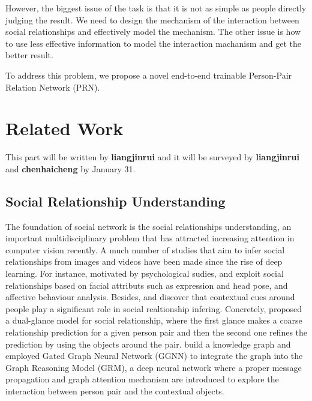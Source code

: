 \documentclass{article}
\begin{document}
However, the biggest issue of the task is that it is not as simple as people directly judging the result. We need to design the mechanism of the interaction between social relationships and effectively model the mechanism. The other issue is how to use less effective information to model the interaction machanism and get the better result.

To address this problem, we propose a novel end-to-end trainable Person-Pair Relation Network (PRN).

\section{Related Work}

This part will be written by {\bf liangjinrui} and it will be surveyed by {\bf liangjinrui} and {\bf chenhaicheng} by January 31.

\subsection{Social Relationship Understanding}

The foundation of social network is the social relationships understanding, an important multidisciplinary problem that has attracted increasing attention in computer vision recently. A much number of studies that aim to infer social relationships from images \cite{DBLP:conf/ijcai/WangWG15,DBLP:conf/iccv/LiWZK17,DBLP:conf/ijcai/WangCRYCL18,DBLP:conf/eccv/WangGLF10,DBLP:conf/iccv/ZhangLLT15} and videos \cite{DBLP:conf/eccv/DingY10,DBLP:conf/cvpr/RamanathanY013,DBLP:journals/ivc/VinciarelliPB09} have been made since the rise of deep learning. For instance, motivated by psychological sudies, \cite{DBLP:conf/iccv/ZhangLLT15} and \cite{DBLP:conf/iccv/DibekliogluSG13} exploit social relationships based on facial attributs such as expression and head pose, and affective behaviour analysis. Besides, \cite{DBLP:conf/iccv/LiWZK17} and \cite{DBLP:conf/ijcai/WangCRYCL18} discover that contextual cues around people play a significant role in social realtionship infering. Concretely, \cite{DBLP:conf/iccv/LiWZK17} proposed a dual-glance model for social relationship, where the first glance makes a coarse relationship prediction for a given person pair and then the second one refines the prediction by using the objects around the pair. \cite{DBLP:conf/ijcai/WangCRYCL18} build a knowledge graph and employed Gated Graph Neural Network (GGNN) \cite{DBLP:journals/tomccap/LiSKJZW15} to integrate the graph into the Graph Reasoning Model (GRM), a deep neural network where a proper message propagation and graph attention mechanism are introduced to explore the interaction between person pair and the contextual objects.
\end{document}
